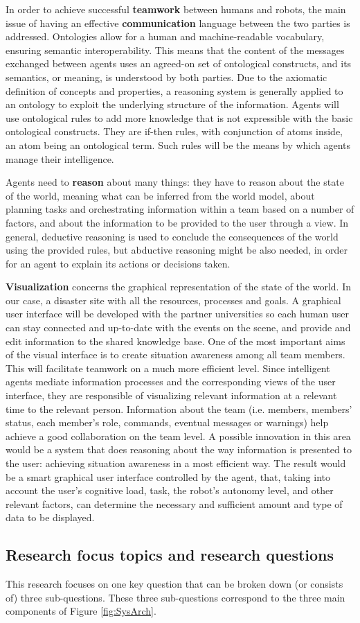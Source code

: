 In order to achieve successful \textbf{teamwork} between humans and robots, the main issue of having an effective \textbf{communication} language between the two parties is addressed. Ontologies allow for a human and machine-readable vocabulary, ensuring semantic interoperability. This means that the content of the messages exchanged between agents uses an agreed-on set of ontological constructs, and its semantics, or meaning, is understood by both parties. Due to the axiomatic definition of concepts and properties, a reasoning system is generally applied to an ontology to exploit the underlying structure of the information. Agents will use ontological rules to add more knowledge that is not expressible with the basic ontological constructs. They are if-then rules, with conjunction of atoms inside, an atom being an ontological term.
Such rules will be the means by which agents manage their intelligence. 

Agents need to \textbf{reason} about many things: they have to reason about the state of the world, meaning what can be inferred from the world model, about planning tasks and orchestrating information within a team based on a number of factors, and about the information to be provided to the user through a view. In general, deductive reasoning is used to conclude the consequences of the world using the provided rules, but abductive reasoning might be also needed, in order for an agent to explain its actions or decisions taken.

\textbf{Visualization} concerns the graphical representation of the state of the world. In our case, a disaster site with all the resources, processes and goals. A graphical user interface will be developed with the partner universities so each human user can stay connected and up-to-date with the events on the scene, and provide and edit information to the shared knowledge base. One of the most important aims of the visual interface is to create situation awareness among all team members. This will facilitate teamwork on a much more efficient level.
Since intelligent agents mediate information processes and the corresponding views of the user interface, they are responsible of visualizing relevant information at a relevant time to the relevant person. Information about the team (i.e. members, members' status, each member's role, commands, eventual messages or warnings) help achieve a good collaboration on
the team level. A possible innovation in this area would be a system that does reasoning about the way information is presented to the user: achieving situation awareness in a most efficient way. The result would be a smart graphical user interface controlled by the agent, that, taking into account the user's cognitive load, task, the robot's autonomy level, and other relevant factors, can determine the necessary and sufficient amount and type of data to be displayed.


\subsection{Research focus topics and research questions}
    
This research focuses on one key question that can be broken down (or consists of) three sub-questions. These three sub-questions correspond to the three main components of Figure \ref{fig:SysArch}.   
